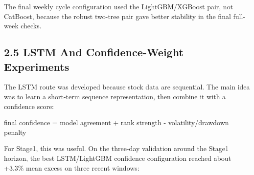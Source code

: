 \documentclass[11pt]{article}
\newenvironment{Shaded}{}{}
\newcommand{\NormalTok}[1]{#1}
\begin{document}
The final weekly cycle configuration used the LightGBM/XGBoost pair, not
CatBoost, because the robust two-tree pair gave better stability in the
final full-week checks.

\subsection{2.5 LSTM And Confidence-Weight
Experiments}\label{lstm-and-confidence-weight-experiments}

The LSTM route was developed because stock data are sequential. The main
idea was to learn a short-term sequence representation, then combine it
with a confidence score:

\begin{Shaded}
\begin{Highlighting}[]
\NormalTok{final confidence = model agreement + rank strength {-} volatility/drawdown penalty}
\end{Highlighting}
\end{Shaded}

For Stage1, this was useful. On the three-day validation around the
Stage1 horizon, the best LSTM/LightGBM confidence configuration reached
about +3.3\% mean excess on three recent windows:
\end{document}

